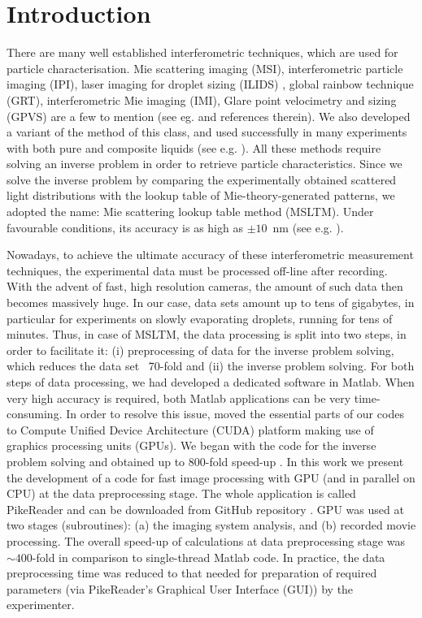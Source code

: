 \documentclass[preprint,review,12pt,dvips]{elsarticle}
\begin{document}
\section{Introduction}
        There are many well established interferometric techniques, which are used for particle characterisation. Mie scattering
    imaging (MSI), interferometric particle imaging (IPI), laser imaging for droplet sizing (ILIDS) \cite{ILIDS}, global
    rainbow technique (GRT), interferometric Mie imaging (IMI), Glare point velocimetry and sizing (GPVS) \cite{GPVS} are a few to mention (see eg. \cite{Dehaeck} and references therein).
    We also developed a variant of the method of this class, and used successfully in many experiments with both pure and composite liquids (see
    e.g. \cite{N2andAir,liquids,RoP,weightvsscatt,Hi-precission}). All these methods require solving an inverse problem in
    order to retrieve particle characteristics. Since we solve the inverse problem by comparing the experimentally obtained
    scattered light distributions with the lookup table of Mie-theory-generated patterns, we adopted the name: Mie scattering
    lookup table method (MSLTM). Under favourable conditions, its accuracy is as high as $\pm 10$~nm (see e.g.
    \cite{Hi-precission}).

    Nowadays, to achieve the ultimate accuracy of these interferometric measurement techniques, the experimental data must be processed
    off-line after recording. With the advent of fast, high resolution cameras, the amount of such data then becomes massively huge.
    In our case, data sets amount up to tens of gigabytes, in particular for experiments on slowly evaporating droplets, running for tens
    of minutes. Thus, in case of MSLTM, the data processing is split into two steps, in order to facilitate it: (i)
    preprocessing of data for the inverse problem solving, which reduces the data set ~70-fold and (ii) the inverse
    problem solving. For both steps of data processing, we had developed a dedicated software in Matlab. When very high accuracy is required,
    both Matlab applications can be very time-consuming. In order to resolve this issue, moved the essential parts of our codes
    to Compute Unified Device Architecture (CUDA) platform making use of graphics processing units (GPUs). We began with the
    code for the inverse problem solving and obtained up to 800-fold speed-up \cite{Smigacz}. In this work we present the
    development of a code for fast image processing with GPU (and in parallel on CPU) at the data preprocessing stage. The
    whole application is called PikeReader and can be downloaded from GitHub repository \cite{PikeReader}. GPU was used at two
    stages (subroutines): (a) the imaging system analysis, and (b) recorded movie processing. The overall speed-up of
    calculations at data preprocessing stage was $\sim 400$-fold in comparison to single-thread Matlab code. In practice, the
    data preprocessing time was reduced to that needed for preparation of required parameters (via PikeReader's Graphical User
    Interface (GUI)) by the experimenter.
\end{document}
